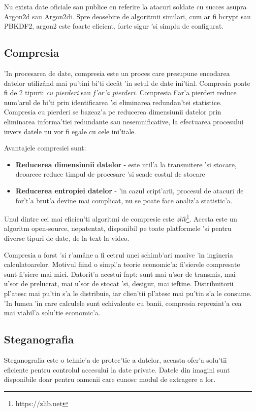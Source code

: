 \documentclass[12pt,a4paper,twoside]{report}
\begin{document}
Nu exista date oficiale sau publice cu referire la atacuri soldate cu succes asupra Argon2d sau Argon2di. Spre deosebire de algoritmii similari, cum ar fi bcrypt sau PBKDF2, argon2 este foarte eficient, forte sigur 'si simplu de configurat.
\subsection{Compresia}
'In procesarea de date, compresia\cite{understanding_compression} este un proces care presupune encodarea datelor utilizând mai pu'tini bi'ti decât 'in setul de date ini'tial. Compresia poate fi de 2 tipuri: \textit{cu pierderi} sau \textit{f'ar'a pierderi}. Compresia f'ar'a pierderi reduce num'arul de bi'ti prin identificarea 'si eliminarea redundan'tei statistice. Compresia cu pierderi se bazeaz'a pe reducerea dimensiunii datelor prin eliminarea informa'tiei redundante sau nesemnificative, la efectuarea procesului invers datele nu vor fi egale cu cele ini'tiale.

Avantajele compresiei sunt: 
\begin{itemize}
\item{\textbf{Reducerea dimensiunii datelor} - este util'a la transmitere 'si stocare, deoarece reduce timpul de procesare 'si scade costul de stocare}
\item{\textbf{Reducerea entropiei datelor} - 'in cazul cript'arii, procesul de atacuri de for't'a brut'a devine mai complicat, nu se poate face analiz'a statistic'a.}
\end{itemize}

Unul dintre cei mai eficien'ti algoritmi de compresie este \textit{zlib}\footnote{https://zlib.net}.  Acesta este un algoritm open-source, nepatentat, disponibil pe toate platformele 'si pentru diverse tipuri de date, de la text la video. 

Compresia a forst 'si r'amâne a fi cetrul unei schimb'ari masive 'in ingineria calculatoarelor. Motivul fiind o simpl'a teorie economic'a: fi'sierele compresate sunt fi'siere mai mici. Datorit'a acestui fapt: sunt mai u'sor de transmis, mai u'sor de prelucrat, mai u'sor de stocat 'si, desigur, mai ieftine. Distribuitorii pl'atesc mai pu'tin s'a le distribuie, iar clien'tii pl'atesc mai pu'tin s'a le consume. 'In lumea 'in care calculele sunt echivalente cu banii, compresia reprezint'a cea mai viabil'a solu'tie economic'a.
\subsection{Steganografia}
Steganografia\cite{crypto_stegano} este o tehnic'a de protec'tie a datelor, aceasta ofer'a solu'tii eficiente pentru controlul accesului la date private. Datele din imagini sunt disponibile doar pentru oamenii care cunosc modul de extragere a lor.
\end{document}
